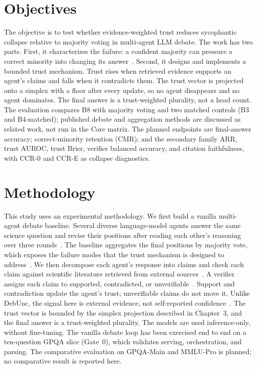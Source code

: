 \section{Objectives}\label{sec:objectives}

The objective is to test whether evidence-weighted trust reduces sycophantic collapse relative to majority voting in multi-agent LLM debate. The work has two parts. First, it characterizes the failure: a confident majority can pressure a correct minority into changing its answer~\cite{he2026minority,pitre-etal-2025-consensagent}. Second, it designs and implements a bounded trust mechanism. Trust rises when retrieved evidence supports an agent's claims and falls when it contradicts them. The trust vector is projected onto a simplex with a floor after every update, so no agent disappears and no agent dominates. The final answer is a trust-weighted plurality, not a head count. The evaluation compares B8 with majority voting and two matched controls (B3 and B4-matched); published debate and aggregation methods are discussed as related work, not run in the Core matrix. The planned endpoints are final-answer accuracy; correct-minority retention (CMR); and the secondary family ARR, trust AUROC, trust Brier, verifier balanced accuracy, and citation faithfulness, with CCR-0 and CCR-E as collapse diagnostics.

\section{Methodology}\label{sec:methodology}

This study uses an experimental methodology. We first build a vanilla multi-agent debate baseline. Several diverse language-model agents answer the same science question and revise their positions after reading each other's reasoning over three rounds~\cite{du2024improving}. The baseline aggregates the final positions by majority vote, which exposes the failure modes that the trust mechanism is designed to address~\cite{choi2025debate}. We then decompose each agent's response into claims and check each claim against scientific literature retrieved from external sources~\cite{karpukhin2020dense}. A verifier assigns each claim to supported, contradicted, or unverifiable~\cite{kushwaha2026agentbased}. Support and contradiction update the agent's trust; unverifiable claims do not move it. Unlike DebUnc, the signal here is external evidence, not self-reported confidence~\cite{yoffe-etal-2025-debunc}. The trust vector is bounded by the simplex projection described in Chapter~3, and the final answer is a trust-weighted plurality. The models are used inference-only, without fine-tuning. The vanilla debate loop has been exercised end to end on a ten-question GPQA slice (Gate~0), which validates serving, orchestration, and parsing. The comparative evaluation on GPQA-Main and MMLU-Pro is planned; no comparative result is reported here.


